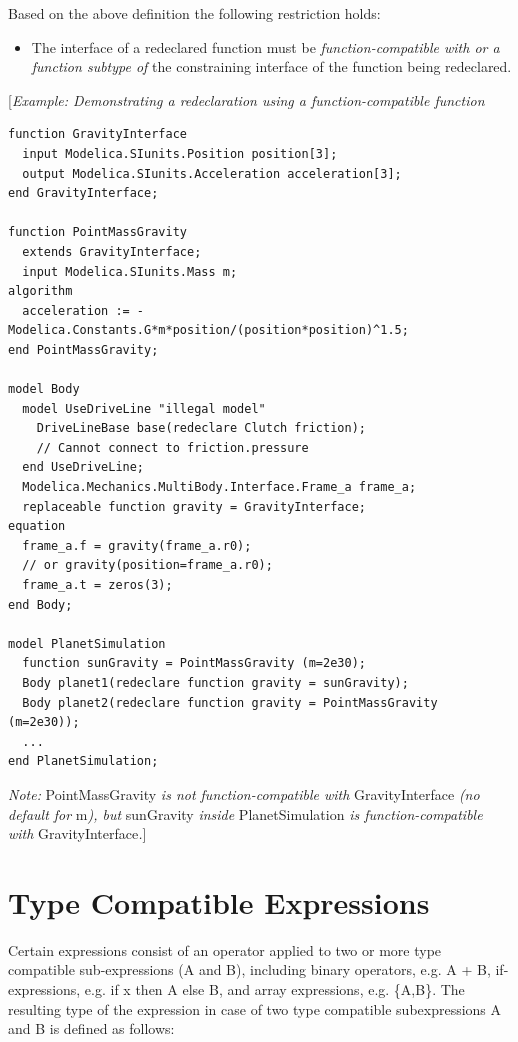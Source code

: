 \documentclass[10pt,a4paper]{report}
\def\doublelabel#1{\label{#1}\hypertarget{#1}{}}
\begin{document}
Based on the above definition the following restriction holds:

\begin{itemize}
\item
  The interface of a redeclared function must be
  \emph{function-compatible with or a function subtype of} the
  constraining interface of the function being redeclared.
\end{itemize}

{[}\emph{Example: Demonstrating a redeclaration using a
function-compatible function}
\begin{lstlisting}[language=modelica]
function GravityInterface
  input Modelica.SIunits.Position position[3];
  output Modelica.SIunits.Acceleration acceleration[3];
end GravityInterface;

function PointMassGravity
  extends GravityInterface;
  input Modelica.SIunits.Mass m;
algorithm 
  acceleration := -Modelica.Constants.G*m*position/(position*position)^1.5;
end PointMassGravity;

model Body
  model UseDriveLine "illegal model"
    DriveLineBase base(redeclare Clutch friction);
    // Cannot connect to friction.pressure
  end UseDriveLine;
  Modelica.Mechanics.MultiBody.Interface.Frame_a frame_a;
  replaceable function gravity = GravityInterface;
equation 
  frame_a.f = gravity(frame_a.r0);
  // or gravity(position=frame_a.r0);
  frame_a.t = zeros(3);
end Body;

model PlanetSimulation
  function sunGravity = PointMassGravity (m=2e30);
  Body planet1(redeclare function gravity = sunGravity);
  Body planet2(redeclare function gravity = PointMassGravity (m=2e30));
  ...
end PlanetSimulation;
\end{lstlisting}

\emph{Note:} PointMassGravity \emph{is not function-compatible with}
GravityInterface \emph{(no default for} m\emph{), but} sunGravity
\emph{inside} PlanetSimulation \emph{is function-compatible with}
GravityInterface\emph{.}{]}

\section{Type Compatible Expressions}\doublelabel{type-compatible-expressions}

Certain expressions consist of an operator applied to two or more type
compatible sub-expressions (A and B), including binary operators, e.g. A
+ B, if-expressions, e.g. if x then A else B, and array expressions,
e.g. \{A,B\}. The resulting type of the expression in case of two type
compatible subexpressions A and B is defined as follows:
\end{document}
